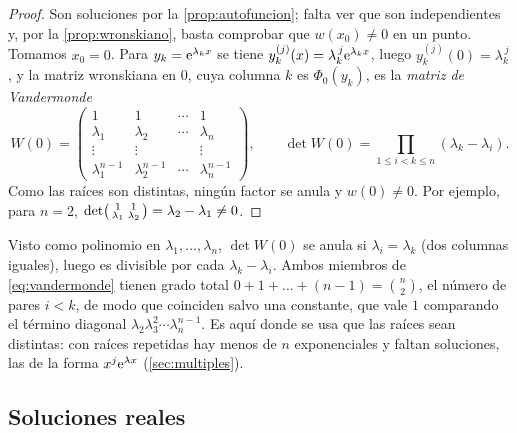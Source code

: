 \begin{proof}
Son soluciones por la \cref{prop:autofuncion}; falta ver que son
independientes y, por la \cref{prop:wronskiano}, basta comprobar que
$w(x_0)\neq0$ en un punto. Tomamos $x_0=0$. Para $y_k=\mathrm{e}^{\lambda_kx}$ se
tiene $y_k^{(j)}(x)=\lambda_k^{\,j}\mathrm{e}^{\lambda_kx}$, luego
$y_k^{(j)}(0)=\lambda_k^{\,j}$, y la matriz wronskiana en $0$, cuya columna
$k$ es $\Phi_0(y_k)$, es la \emph{matriz de Vandermonde}
\begin{equation}\label{eq:vandermonde}
  W(0)=\begin{pmatrix}
    1 & 1 & \cdots & 1\\
    \lambda_1 & \lambda_2 & \cdots & \lambda_n\\
    \vdots & \vdots & & \vdots\\
    \lambda_1^{n-1} & \lambda_2^{n-1} & \cdots & \lambda_n^{n-1}
  \end{pmatrix},
  \qquad
  \det W(0)=\prod_{1\le i<k\le n}(\lambda_k-\lambda_i).
\end{equation}
Como las raíces son distintas, ningún factor se anula y $w(0)\neq0$. Por
ejemplo, para $n=2$,
$\det\begin{psmallmatrix}1&1\\\lambda_1&\lambda_2\end{psmallmatrix}=\lambda_2-\lambda_1\neq0$.
\end{proof}

\begin{observacion}\label{obs:vandermonde}
Visto como polinomio en $\lambda_1,\dots,\lambda_n$, $\det W(0)$ se anula si
$\lambda_i=\lambda_k$ (dos columnas iguales), luego es divisible por cada
$\lambda_k-\lambda_i$. Ambos miembros de \eqref{eq:vandermonde} tienen grado
total $0+1+\dots+(n-1)=\binom n2$, el número de pares $i<k$, de modo que
coinciden salvo una constante, que vale $1$ comparando el término diagonal
$\lambda_2\lambda_3^{2}\cdots\lambda_n^{n-1}$. Es aquí donde se usa que las
raíces sean distintas: con raíces repetidas hay menos de $n$ exponenciales
y faltan soluciones, las de la forma $x^{j}\mathrm{e}^{\lambda x}$
(\cref{sec:multiples}).
\end{observacion}

\subsection{Soluciones reales}\label{sec:reales}

